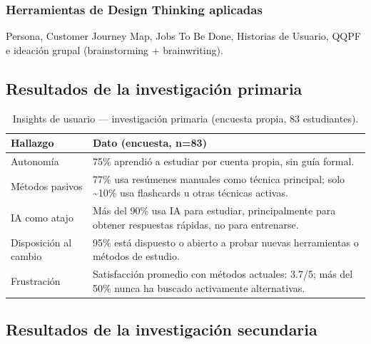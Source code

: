 \documentclass[11pt,a4paper]{article}
\begin{document}
\subsubsection{Herramientas de Design Thinking aplicadas}
Persona, Customer Journey Map, Jobs To Be Done, Historias de Usuario, QQPF e ideaci\'on grupal (brainstorming + brainwriting).

\subsection{Resultados de la investigaci\'on primaria}

\begin{table}[H]
\centering
\small
\begin{tabularx}{\textwidth}{@{}l Y@{}}
\toprule
\textbf{Hallazgo} & \textbf{Dato (encuesta, n=83)} \\
\midrule
Autonom\'ia & 75\% aprendi\'o a estudiar por cuenta propia, sin gu\'ia formal. \\
M\'etodos pasivos & 77\% usa res\'umenes manuales como t\'ecnica principal; solo \textasciitilde10\% usa flashcards u otras t\'ecnicas activas. \\
IA como atajo & M\'as del 90\% usa IA para estudiar, principalmente para obtener respuestas r\'apidas, no para entrenarse. \\
Disposici\'on al cambio & 95\% est\'a dispuesto o abierto a probar nuevas herramientas o m\'etodos de estudio. \\
Frustraci\'on & Satisfacci\'on promedio con m\'etodos actuales: 3.7/5; m\'as del 50\% nunca ha buscado activamente alternativas. \\
\bottomrule
\end{tabularx}
\caption{Insights de usuario --- investigaci\'on primaria (encuesta propia, 83 estudiantes).}
\end{table}

\subsection{Resultados de la investigaci\'on secundaria}
\end{document}

